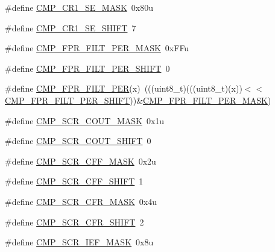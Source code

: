\begin{DoxyCompactItemize}
\item 
\#define \hyperlink{group___c_m_p___register___masks_ga899d139651dd67746e73452ff19e892b}{C\+M\+P\+\_\+\+C\+R1\+\_\+\+S\+E\+\_\+\+M\+A\+SK}~0x80u
\item 
\#define \hyperlink{group___c_m_p___register___masks_ga57cd3f81d8844d4e0509f342ae5170bb}{C\+M\+P\+\_\+\+C\+R1\+\_\+\+S\+E\+\_\+\+S\+H\+I\+FT}~7
\item 
\#define \hyperlink{group___c_m_p___register___masks_gaf8ca758656c156ecadfbb6f9e57a3eef}{C\+M\+P\+\_\+\+F\+P\+R\+\_\+\+F\+I\+L\+T\+\_\+\+P\+E\+R\+\_\+\+M\+A\+SK}~0x\+F\+Fu
\item 
\#define \hyperlink{group___c_m_p___register___masks_gaa563be7a82c0c1e3802e7ac7c920bf3a}{C\+M\+P\+\_\+\+F\+P\+R\+\_\+\+F\+I\+L\+T\+\_\+\+P\+E\+R\+\_\+\+S\+H\+I\+FT}~0
\item 
\#define \hyperlink{group___c_m_p___register___masks_ga006ee9cac0b4b9daa94e3b1d6a440627}{C\+M\+P\+\_\+\+F\+P\+R\+\_\+\+F\+I\+L\+T\+\_\+\+P\+ER}(x)~(((uint8\+\_\+t)(((uint8\+\_\+t)(x))$<$$<$\hyperlink{group___c_m_p___register___masks_gaa563be7a82c0c1e3802e7ac7c920bf3a}{C\+M\+P\+\_\+\+F\+P\+R\+\_\+\+F\+I\+L\+T\+\_\+\+P\+E\+R\+\_\+\+S\+H\+I\+FT}))\&\hyperlink{group___c_m_p___register___masks_gaf8ca758656c156ecadfbb6f9e57a3eef}{C\+M\+P\+\_\+\+F\+P\+R\+\_\+\+F\+I\+L\+T\+\_\+\+P\+E\+R\+\_\+\+M\+A\+SK})
\item 
\#define \hyperlink{group___c_m_p___register___masks_ga024aec72a28ecdc04a1441cd7a3af23a}{C\+M\+P\+\_\+\+S\+C\+R\+\_\+\+C\+O\+U\+T\+\_\+\+M\+A\+SK}~0x1u
\item 
\#define \hyperlink{group___c_m_p___register___masks_gaa508076192a6b9aed5c4d46282c64394}{C\+M\+P\+\_\+\+S\+C\+R\+\_\+\+C\+O\+U\+T\+\_\+\+S\+H\+I\+FT}~0
\item 
\#define \hyperlink{group___c_m_p___register___masks_gaab44e3da0576b12dd809881323944a1c}{C\+M\+P\+\_\+\+S\+C\+R\+\_\+\+C\+F\+F\+\_\+\+M\+A\+SK}~0x2u
\item 
\#define \hyperlink{group___c_m_p___register___masks_ga076d455f0d5bdad02282cbcce6e04c01}{C\+M\+P\+\_\+\+S\+C\+R\+\_\+\+C\+F\+F\+\_\+\+S\+H\+I\+FT}~1
\item 
\#define \hyperlink{group___c_m_p___register___masks_ga876bfa2799338c6b10b152940d25c4a7}{C\+M\+P\+\_\+\+S\+C\+R\+\_\+\+C\+F\+R\+\_\+\+M\+A\+SK}~0x4u
\item 
\#define \hyperlink{group___c_m_p___register___masks_ga78595d16db987c96e73ce96fc5436f6b}{C\+M\+P\+\_\+\+S\+C\+R\+\_\+\+C\+F\+R\+\_\+\+S\+H\+I\+FT}~2
\item 
\#define \hyperlink{group___c_m_p___register___masks_gab36859944bb484db243358bb9a1a9692}{C\+M\+P\+\_\+\+S\+C\+R\+\_\+\+I\+E\+F\+\_\+\+M\+A\+SK}~0x8u
$$
\end{DoxyCompactItemize}
